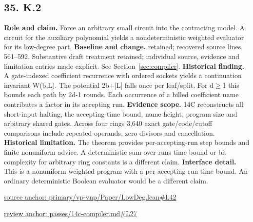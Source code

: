 \documentclass[11pt,letterpaper]{article}
\theoremstyle{definition}\newtheorem{definition}[theorem]{Definition}\newtheorem{example}[theorem]{Example}
\theoremstyle{remark}\newtheorem{remark}[theorem]{Remark}
\begin{document}
\subsection*{35. K.2}
\textbf{Role and claim.} Force an arbitrary small circuit into the contracting model. A circuit for the auxiliary polynomial yields a nondeterministic weighted evaluator for its low-degree part.
\textbf{Baseline and change.} retained; recovered source lines 561--592. Substantive draft treatment retained; individual source, evidence and limitation entries made explicit. See Section~\ref{sec:compiler}.
\textbf{Historical finding.} A gate-indexed coefficient recurrence with ordered sockets yields a continuation invariant W(b,L). The potential 2b+|L| falls once per leaf/split. For d\ensuremath{\ge}1 this bounds each path by 2d-1 rounds. Each occurrence of a billed coefficient name contributes a factor in its accepting run.
\textbf{Evidence scope.} 14C reconstructs all short-input halting, the accepting-time bound, name height, program size and arbitrary shared gates. Across four rings 3,640 exact gate/code/cutoff comparisons include repeated operands, zero divisors and cancellation.
\textbf{Historical limitation.} The theorem provides per-accepting-run step bounds and finite nonuniform advice. A deterministic sum-over-runs time bound or bit complexity for arbitrary ring constants is a different claim.
\textbf{Interface detail.} This is a nonuniform weighted program with a per-accepting-run time bound. An ordinary deterministic Boolean evaluator would be a different claim.
\par\href{https://github.com/nousentllc/VP-VNP-Review/blob/8a7976933b6b2b4ffda1ad3a0dfb5fc6b6f023e8/primary/vp-vnp/Paper/LowDeg.lean\#L42}{source anchor: primary/vp-vnp/Paper/LowDeg.lean\#L42}
\par\href{https://github.com/nousentllc/VP-VNP-Review/blob/8a7976933b6b2b4ffda1ad3a0dfb5fc6b6f023e8/passes/14c-compiler.md\#L27}{review anchor: passes/14c-compiler.md\#L27}
\goodbreak
\end{document}
